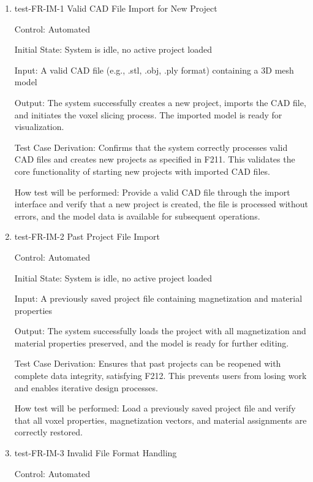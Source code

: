 \documentclass[12pt, titlepage]{article}
\begin{document}
\begin{enumerate}

\item{test-FR-IM-1 Valid CAD File Import for New Project\\}

Control: Automated
					
Initial State: System is idle, no active project loaded
					
Input: A valid CAD file (e.g., .stl, .obj, .ply format) containing a 3D mesh model
					
Output: The system successfully creates a new project, imports the CAD file, and initiates
the voxel slicing process. The imported model is ready for visualization.

Test Case Derivation: Confirms that the system correctly processes valid CAD files and creates
new projects as specified in F211. This validates the core functionality of starting new projects
with imported CAD files.
					
How test will be performed: Provide a valid CAD file through the import interface and verify
that a new project is created, the file is processed without errors, and the model data is
available for subsequent operations.

\item{test-FR-IM-2 Past Project File Import\\}

Control: Automated
					
Initial State: System is idle, no active project loaded
					
Input: A previously saved project file containing magnetization and material properties
					
Output: The system successfully loads the project with all magnetization and material
properties preserved, and the model is ready for further editing.

Test Case Derivation: Ensures that past projects can be reopened with complete data integrity,
satisfying F212. This prevents users from losing work and enables iterative design processes.
					
How test will be performed: Load a previously saved project file and verify that all voxel
properties, magnetization vectors, and material assignments are correctly restored.

\item{test-FR-IM-3 Invalid File Format Handling\\}

Control: Automated
					

\end{enumerate}
\end{document}
